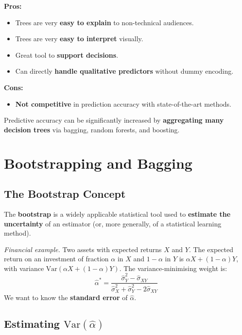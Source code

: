 \documentclass[11pt,a4paper]{article}
\theoremstyle{definition}
\theoremstyle{plain}
\theoremstyle{remark}
\begin{document}
\begin{tcolorbox}[colback=green!5!white,colframe=green!75!black,title=\textbf{Pros and Cons}]
\textbf{Pros:}
\begin{itemize}
    \item Trees are very \textbf{easy to explain} to non-technical audiences.
    \item Trees are very \textbf{easy to interpret} visually.
    \item Great tool to \textbf{support decisions}.
    \item Can directly \textbf{handle qualitative predictors} without dummy encoding.
\end{itemize}
\textbf{Cons:}
\begin{itemize}
    \item \textbf{Not competitive} in prediction accuracy with state-of-the-art methods.
\end{itemize}
\end{tcolorbox}

Predictive accuracy can be significantly increased by \textbf{aggregating many decision trees} via bagging, random forests, and boosting.


\section{Bootstrapping and Bagging}

\subsection{The Bootstrap Concept}

The \textbf{bootstrap} is a widely applicable statistical tool used to \textbf{estimate the uncertainty} of an estimator (or, more generally, of a statistical learning method).

\textit{Financial example.} Two assets with expected returns $X$ and $Y$. The expected return on an investment of fraction $\alpha$ in $X$ and $1-\alpha$ in $Y$ is $\alpha X + (1-\alpha) Y$, with variance $\mathrm{Var}(\alpha X + (1 - \alpha) Y)$. The variance-minimising weight is:
\[
    \hat{\alpha}^* = \frac{\hat{\sigma}_Y^2 - \hat{\sigma}_{XY}}{\hat{\sigma}_X^2 + \hat{\sigma}_Y^2 - 2\hat{\sigma}_{XY}}
\]
We want to know the \textbf{standard error} of $\hat{\alpha}$.

\subsection{Estimating $\mathrm{Var}(\hat{\alpha})$}
\end{document}
